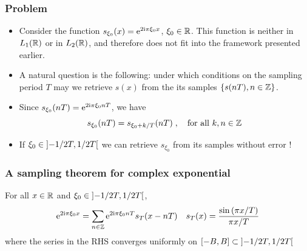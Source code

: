 \begin{frame}
\frametitle{Problem}
\begin{itemize}
\item Consider the function $s_{\xi_0}(x)= \mathrm{e}^{2 \mathrm{i} \pi \xi_0 x}$, $\xi_0 \in \mathbb{R}$. This function is neither in $L_1(\mathbb{R})$ or in $L_2(\mathbb{R})$, and therefore does not fit into the framework presented earlier.
\item A natural question is the following: under which conditions on the sampling period $T$ may we retrieve $s(x)$ from the its samples $\{s(nT), n \in \mathbb{Z}\}$.
\item Since $s_{\xi_0}(nT)= \mathrm{e}^{2 \mathrm{i} \pi \xi_0 n T}$, we have 
$$
s_{\xi_0}(nT)= s_{\xi_0 + k/T}(nT) \;, \quad \text{for all $k,n \in \mathbb{Z}$}
$$ 
\item If $\xi_0 \in \left]-1/2T,1/2T\right[$ we can retrieve $s_{\xi_0}$ from its samples without error !
\end{itemize}
\end{frame}


\begin{frame}
\frametitle{A sampling theorem for complex exponential}
\begin{theorem}
For all $x \in \mathbb{R}$ and  $\xi_0 \in \left]-1/2T,1/2T\right[$,
\[
\mathrm{e}^{2 \mathrm{i} \pi \xi_0 x} = \sum_{n \in \mathbb{Z}} \mathrm{e}^{2 \mathrm{i} \pi \xi_0 n T} s_T(x - nT) \quad s_T(x)= \frac{\sin\left( \pi x/T \right)}{\pi x /T}
\]
where the series in the RHS converges uniformly on $\left[-B,B\right] \subset \left]-1/2T,1/2T\right[$
\end{theorem}
\end{frame}

